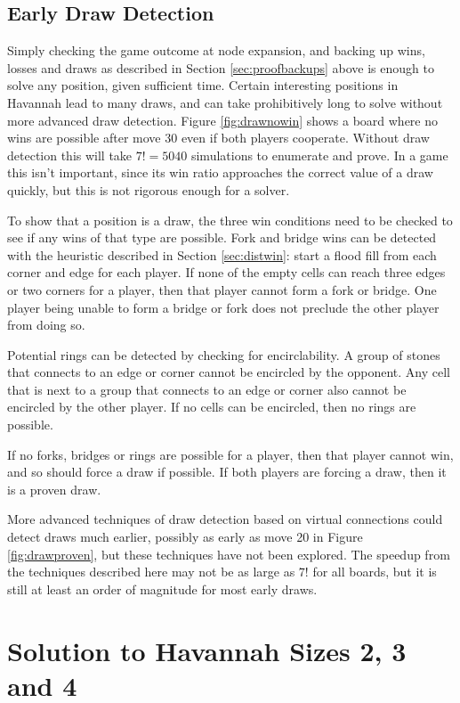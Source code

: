 \subsection{Early Draw Detection}\label{sec:drawdetect}

Simply checking the game outcome at node expansion, and backing up wins, losses and draws as described in Section \ref{sec:proofbackups} above is enough to solve any position, given sufficient time. Certain interesting positions in Havannah lead to many draws, and can take prohibitively long to solve without more advanced draw detection. Figure \ref{fig:drawnowin} shows a board where no wins are possible after move 30 even if both players cooperate. Without draw detection this will take $7!=5040$ simulations to enumerate and prove. In a game this isn't important, since its win ratio approaches the correct value of a draw quickly, but this is not rigorous enough for a solver.

To show that a position is a draw, the three win conditions need to be checked to see if any wins of that type are possible. Fork and bridge wins can be detected with the heuristic described in Section \ref{sec:distwin}: start a flood fill from each corner and edge for each player. If none of the empty cells can reach three edges or two corners for a player, then that player cannot form a fork or bridge. One player being unable to form a bridge or fork does not preclude the other player from doing so.

Potential rings can be detected by checking for encirclability. A group of stones that connects to an edge or corner cannot be encircled by the opponent. Any cell that is next to a group that connects to an edge or corner also cannot be encircled by the other player. If no cells can be encircled, then no rings are possible.

If no forks, bridges or rings are possible for a player, then that player cannot win, and so should force a draw if possible. If both players are forcing a draw, then it is a proven draw.

More advanced techniques of draw detection based on virtual connections could detect draws much earlier, possibly as early as move 20 in Figure \ref{fig:drawproven}, but these techniques have not been explored. The speedup from the techniques described here may not be as large as $7!$ for all boards, but it is still at least an order of magnitude for most early draws.


\section{Solution to Havannah Sizes 2, 3 and 4}

